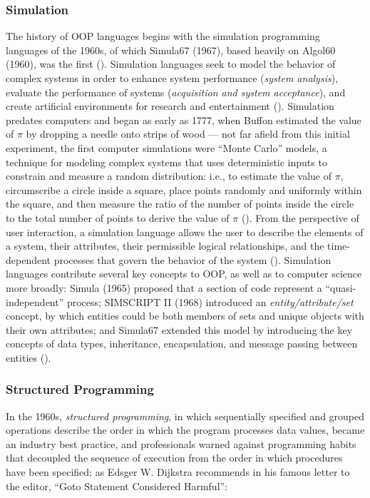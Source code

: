 \subsubsection{Simulation}	
	The history of OOP languages begins with the simulation programming languages of the 1960s, of which Simula67 (1967), based heavily on Algol60 (1960), was the first (\cite[489]{Van-Roy:2004uq}). Simulation languages seek to model the behavior of complex systems in order to enhance system performance (\emph{system analysis}), evaluate the performance of systems (\emph{acquisition and system acceptance}), and create artificial environments for research and entertainment (\cite[162]{nance2002perspectives}). Simulation predates computers and began as early as 1777, when Buffon estimated the value of $\pi$ by dropping a needle onto strips of wood --- not far afield from this initial experiment, the first computer simulations were ``Monte Carlo'' models, a technique for modeling complex systems that uses deterministic inputs to constrain and measure a random distribution: i.e., to estimate the value of $\pi$, circumscribe a circle inside a square, place points randomly and uniformly within the square, and then measure the ratio of the number of points inside the circle to the total number of points to derive the value of $\pi$ (\cite[162]{nance2002perspectives}). From the perspective of user interaction, a simulation language allows the user to describe the elements of a system, their attributes, their permissible logical relationships, and the time-dependent processes that govern the behavior of the system (\cite{Kiviat:1993fj}). Simulation languages contribute several key concepts to OOP, as well as to computer science more broadly: Simula (1965) proposed that a section of code represent a ``quasi-independent'' process; SIMSCRIPT II (1968) introduced an \emph{entity/attribute/set} concept, by which entities could be both members of sets and unique objects with their own attributes; and Simula67 extended this model by introducing the key concepts of data types, inheritance, encapsulation, and message passing between entities (\cite[167]{nance2002perspectives}). 

\subsubsection{Structured Programming}
In the 1960s, \emph{structured programming}, in which sequentially specified and grouped operations describe the order in which the program processes data values, became an industry best practice, and professionals warned against programming habits that decoupled the sequence of execution from the order in which procedures have been specified; as Edsger W. Dijkstra recommends in his famous letter to the editor, ``Goto Statement Considered Harmful'':


